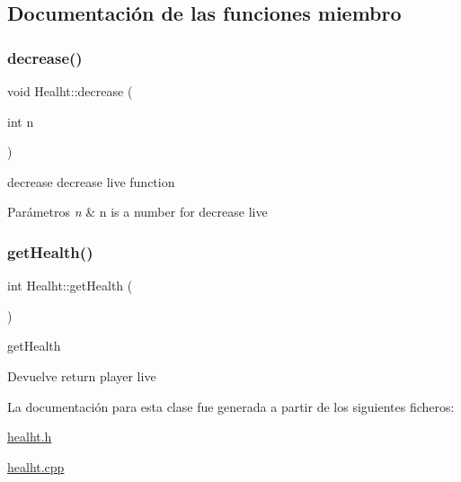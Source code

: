 \subsection{Documentación de las funciones miembro}
\hypertarget{class_healht_a287604024264761de0026122d76f5b9d}{}\label{class_healht_a287604024264761de0026122d76f5b9d} 
\subsubsection{\texorpdfstring{decrease()}{decrease()}}
{\footnotesize\ttfamily void Healht\+::decrease (\begin{DoxyParamCaption}\item[{int}]{n }\end{DoxyParamCaption})}



decrease decrease live function 


\begin{DoxyParams}{Parámetros}
{\em n} & n is a number for decrease live \\
\hline
\end{DoxyParams}
\hypertarget{class_healht_a7ee67dc2c89fb370bc827cfedc8ae150}{}\label{class_healht_a7ee67dc2c89fb370bc827cfedc8ae150} 
\subsubsection{\texorpdfstring{get\+Health()}{getHealth()}}
{\footnotesize\ttfamily int Healht\+::get\+Health (\begin{DoxyParamCaption}{ }\end{DoxyParamCaption})\hspace{0.3cm}{\ttfamily [inline]}}



get\+Health 

\begin{DoxyReturn}{Devuelve}
return player live 
\end{DoxyReturn}


La documentación para esta clase fue generada a partir de los siguientes ficheros\+:\begin{DoxyCompactItemize}
\item 
\hyperlink{healht_8h}{healht.\+h}\item 
\hyperlink{healht_8cpp}{healht.\+cpp}\end{DoxyCompactItemize}
